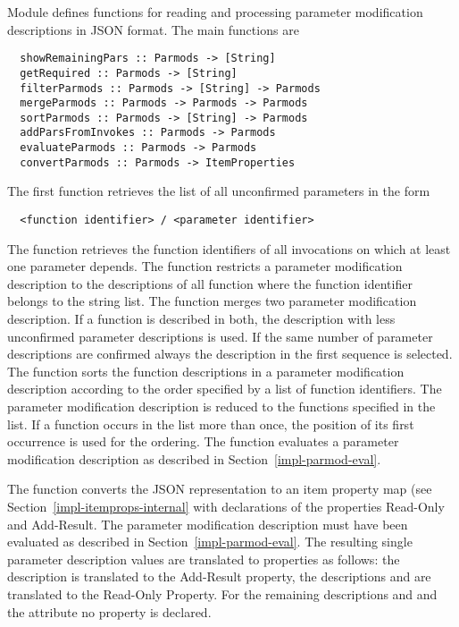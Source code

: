 Module  defines functions for reading and processing parameter modification descriptions in JSON format.
The main functions are 
\begin{verbatim}
  showRemainingPars :: Parmods -> [String]
  getRequired :: Parmods -> [String]
  filterParmods :: Parmods -> [String] -> Parmods
  mergeParmods :: Parmods -> Parmods -> Parmods
  sortParmods :: Parmods -> [String] -> Parmods
  addParsFromInvokes :: Parmods -> Parmods
  evaluateParmods :: Parmods -> Parmods
  convertParmods :: Parmods -> ItemProperties
\end{verbatim}
The first function retrieves the list of all unconfirmed parameters in the form
\begin{verbatim}
  <function identifier> / <parameter identifier>
\end{verbatim}
The function  retrieves the function identifiers of all invocations on which at least one parameter depends.
The function  restricts a parameter modification description to the descriptions of all function
where the function identifier belongs to the string list. 
The function  merges two parameter modification description. If a function is described in both, the description
with less unconfirmed parameter descriptions is used. If the same number of parameter descriptions are confirmed 
always the description in the first sequence is selected. The function  sorts the function descriptions
in a parameter modification description according to the order specified by a list of function identifiers. The parameter
modification description is reduced to the functions specified in the list. If a function occurs in the list more than once, 
the position of its first occurrence is used for the ordering.
The function  evaluates a parameter modification description as described in 
Section~\ref{impl-parmod-eval}. 

The function  converts the JSON representation to an item
property map (see Section~\ref{impl-itemprops-internal} with declarations of the properties Read-Only and Add-Result.
The parameter modification description must have been evaluated as described in Section~\ref{impl-parmod-eval}. The 
resulting single parameter description values are translated to properties as follows: the description 
is translated to the Add-Result property, the descriptions  and  are translated to the 
Read-Only Property. For the remaining descriptions  and  and the 
attribute no property is declared.

